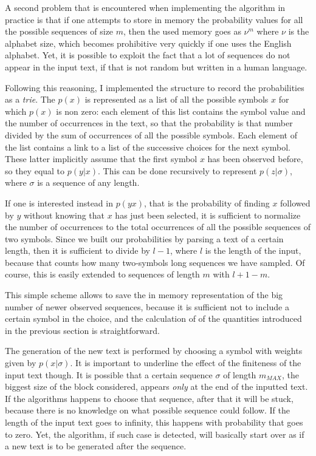 \documentclass[11pt]{article} %
\begin{document}
A second problem that is encountered when implementing the algorithm in practice is that if one attempts to store in memory the probability values for all the possible sequences of size $m$, then the used memory goes as $\nu^m$ where $\nu$ is the alphabet size, which becomes prohibitive very quickly if one uses the English alphabet. Yet, it is possible to exploit the fact that a lot of sequences do not appear in the input text, if that is not random but written in a human language.

Following this reasoning, I implemented the structure to record the probabilities as a \emph{trie}. The $p(x)$ is represented as a list of all the possible symbols $x$ for which $p(x)$ is non zero: each element of this list contains the symbol value and the number of occurrences in the text, so that the probability is that number divided by the sum of occurrences of all the possible symbols. Each element of the list contains a link to a list of the successive choices for the next symbol. These latter implicitly assume that the first symbol $x$ has been observed before, so they equal to $p(y|x)$. This can be done recursively to represent $p(z|\sigma)$, where $\sigma$ is a sequence of any length.

If one is interested instead in $p(yx)$, that is the probability of finding $x$ followed by $y$ without knowing that $x$ has just been selected, it is sufficient to normalize the number of occurrences to the total occurrences of all the possible sequences of two symbols. Since we built our probabilities by parsing a text of a certain length, then it is sufficient to divide by $l-1$, where $l$ is the length of the input, because that counts how many two-symbols long sequences we have sampled. Of course, this is easily extended to sequences of length $m$ with $l+1-m$.

This simple scheme allows to save the in memory representation of the big number of newer observed sequences, because it is sufficient not to include a certain symbol in the choice, and the calculation of of the quantities introduced in the previous section is straightforward.

The generation of the new text is performed by choosing a symbol with weights given by $p(x|\sigma)$. It is important to underline the effect of the finiteness of the input text though. It is possible that a certain sequence $\sigma$ of length $m_{MAX}$, the biggest size of the block considered, appears \emph{only} at the end of the inputted text. If the algorithms happens to choose that sequence, after that it will be stuck, because there is no knowledge on what possible sequence could follow. If the length of the input text goes to infinity, this happens with probability that goes to zero. Yet, the algorithm, if such case is detected, will basically start over as if a new text is to be generated after the sequence.
\end{document}
